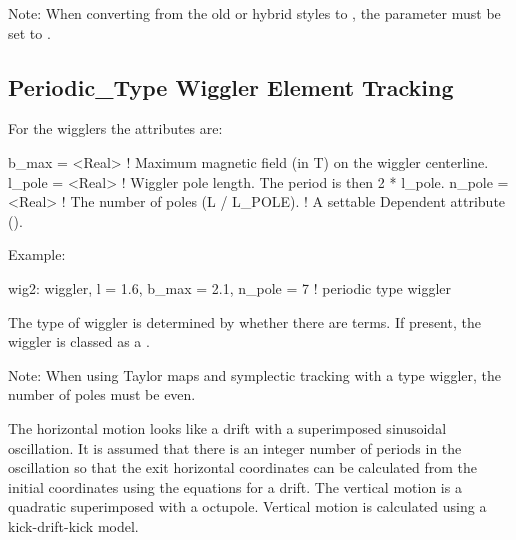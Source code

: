{Note: When converting from the old or hybrid styles to , the
 parameter must be set to .

\subsection{Periodic\_Type Wiggler Element Tracking}
\label{s:wiggler.periodic}

For the  wigglers the attributes are: 
\begin{example}  
  b_max    = <Real>  ! Maximum magnetic field (in T) on the wiggler centerline. 
  l_pole   = <Real>  ! Wiggler pole length. The period is then 2 * l_pole.
  n_pole   = <Real>  ! The number of poles (L / L_POLE). 
                     !   A settable Dependent attribute ().
\end{example}

Example:
\begin{example}
  wig2: wiggler, l = 1.6, b_max = 2.1, n_pole = 7  ! periodic type wiggler
\end{example}

The type of wiggler is determined by whether there are 
terms. If present, the wiggler is classed as a .

Note: When using Taylor maps and symplectic tracking with a
 type wiggler, the number of poles must be even.

The horizontal motion looks like a drift with a superimposed
sinusoidal oscillation. It is assumed that there is an integer number
of periods in the oscillation so that the exit horizontal coordinates
can be calculated from the initial coordinates using the equations for
a drift. The vertical motion is a quadratic superimposed with a
octupole. Vertical motion is calculated using a kick-drift-kick model.

}

